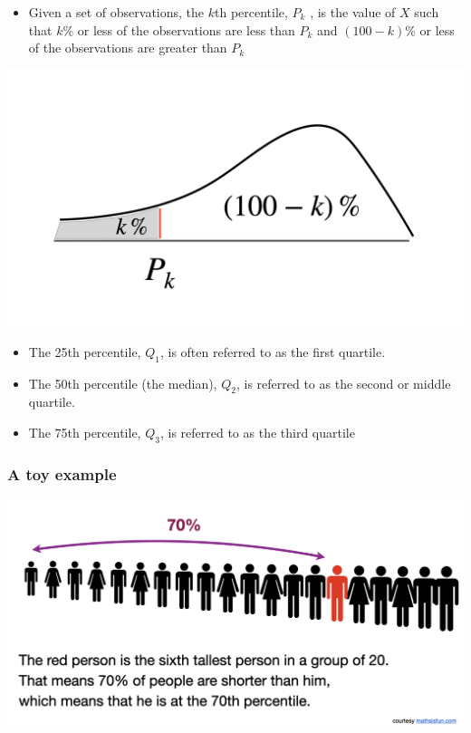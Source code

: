\documentclass[
]{article}
\providecommand{\tightlist}{%
  \setlength{\itemsep}{0pt}\setlength{\parskip}{0pt}}
\begin{document}
\begin{itemize}
\tightlist
\item
  Given a set of observations, the \(k\)th percentile, \(P_k\) , is the
  value of \(X\) such that \(k\)\% or less of the observations are less
  than \(P_k\) and \((100-k)\)\% or less of the observations are greater
  than \(P_k\)
\end{itemize}

\begin{center}\includegraphics[width=1\linewidth,height=1\textheight]{qunatiles} \end{center}

\begin{itemize}
\item
  The 25th percentile, \(Q_1\), is often referred to as the first
  quartile.
\item
  The 50th percentile (the median), \(Q_2\), is referred to as the
  second or middle quartile.
\item
  The 75th percentile, \(Q_3\), is referred to as the third quartile
\end{itemize}

\hypertarget{a-toy-example}{%
\subsubsection{A toy example}\label{a-toy-example}}

\begin{center}\includegraphics[width=0.6\linewidth,height=0.6\textheight]{toyexample} \end{center}
\end{document}

